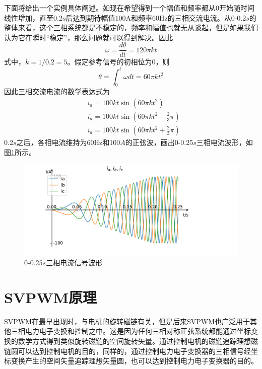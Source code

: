 \documentclass{ctexart}
\numberwithin{equation}{section}
\begin{document}
下面将给出一个实例具体阐述。如现在希望得到一个幅值和频率都从0开始随时间线性增加，直至0.2$s$后达到期待幅值100A和频率60Hz的三相交流电流。从0-0.2$s$的整体来看，这个三相系统都是不稳定的，频率和幅值也就无从谈起，但是如果我们认为它在瞬时“稳定”，那么问题就可以得到解决。因此
\begin{equation}
  \omega = \frac{d\theta}{dt} = 120\pi kt
\end{equation}
式中，$ k = 1/0.2 = 5 $。假定参考信号的初相位为0，则
\begin{equation}
  \theta = \int_0^{t} \omega dt = 60\pi kt^2
\end{equation}
因此三相交流电流的数学表达式为
\begin{equation}
  \begin{aligned}
  	&i_a = 100kt\sin (60\pi kt^2 )\\
  	&i_a = 100kt\sin (60\pi kt^2 -\frac{2}{3}\pi )\\
  	&i_a = 100kt\sin (60\pi kt^2 + \frac{2}{3}\pi )
  \end{aligned}
\end{equation}
0.2$ s $之后，各相电流维持为60Hz和100$ A $的正弦波，画出0-0.25$ s $三相电流波形，如图\ref{kw-kA-sine-wave}所示。

\begin{figure}[hbt]
  \centering
  \includegraphics[width = .8\linewidth ]{sin_wave_kA_kw}
  \caption{0-0.25$ s $三相电流信号波形}
  \label{kw-kA-sine-wave}
\end{figure}

\section{SVPWM原理}
SVPWM在最早出现时，与电机的旋转磁链有关，但是后来SVPWM也广泛用于其他三相电力电子变换和控制之中。这是因为任何三相对称正弦系统都能通过坐标变换的数学方式得到类似旋转磁链的空间旋转矢量。通过控制电机的磁链追踪理想磁链圆可以达到控制电机的目的，同样的，通过控制电力电子变换器的三相信号经坐标变换产生的空间矢量追踪理想矢量圆，也可以达到控制电力电子变换器的目的。
\end{document}

